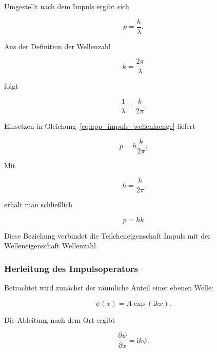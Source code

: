 Umgestellt nach dem Impuls ergibt sich

\begin{equation}
	p
	=
	\frac{h}{\lambda}.
	\label{eq:app_impuls_wellenlaenge}
\end{equation}

Aus der Definition der Wellenzahl

\begin{equation}
	k
	=
	\frac{2\pi}{\lambda}
\end{equation}

folgt

\begin{equation}
	\frac{1}{\lambda}
	=
	\frac{k}{2\pi}.
\end{equation}

Einsetzen in Gleichung~\eqref{eq:app_impuls_wellenlaenge} liefert

\begin{equation}
	p
	=
	h\frac{k}{2\pi}.
\end{equation}

Mit

\begin{equation}
	\hbar
	=
	\frac{h}{2\pi}
\end{equation}

erhält man schließlich

\begin{equation}
	\boxed{
		p
		=
		\hbar k
	}
	\label{eq:app_impuls_hquer_k}
\end{equation}

Diese Beziehung verbindet die Teilcheneigenschaft Impuls mit der
Welleneigenschaft Wellenzahl.

\subsubsection*{Herleitung des Impulsoperators}

Betrachtet wird zunächst der räumliche Anteil einer ebenen Welle:

\begin{equation}
	\psi(x)
	=
	A\exp(\mathrm{i}kx).
	\label{eq:app_ebene_welle_raeumlich}
\end{equation}

Die Ableitung nach dem Ort ergibt

\begin{equation}
	\frac{\partial\psi}{\partial x}
	=
	\mathrm{i}k\psi.
	\label{eq:app_ableitung_ebene_welle}
\end{equation}

